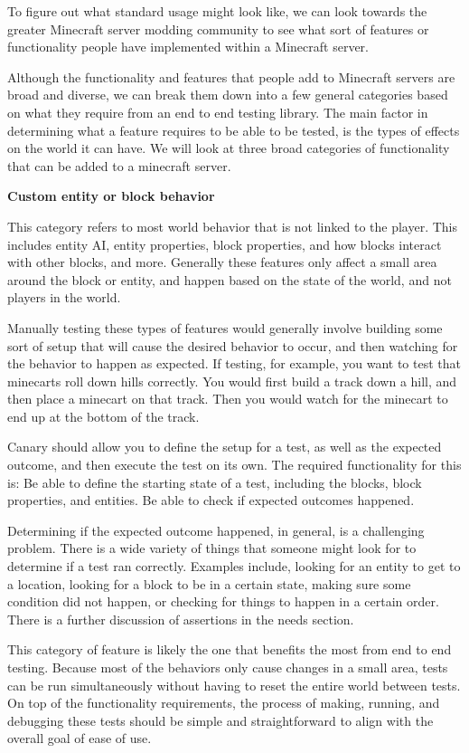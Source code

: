 \documentclass{article}
\begin{document}
\begin{doublespacing}
To figure out what standard usage might look like, we can look towards the greater Minecraft server modding community to see what sort of features or functionality people have implemented within a Minecraft server.

Although the functionality and features that people add to Minecraft servers are broad and diverse, we can break them down into a few general categories based on what they require from an end to end testing library. The main factor in determining what a feature requires to be able to be tested, is the types of effects on the world it can have. We will look at three broad categories of functionality that can be added to a minecraft server.


\noindent \textbf{Custom entity or block behavior}

This category refers to most world behavior that is not linked to the player. This includes entity AI, entity properties, block properties, and how blocks interact with other blocks, and more. Generally these features only affect a small area around the block or entity, and happen based on the state of the world, and not players in the world. 

Manually testing these types of features would generally involve building some sort of setup that will cause the desired behavior to occur, and then watching for the behavior to happen as expected. If testing, for example, you want to test that minecarts roll down hills correctly. You would first build a track down a hill, and then place a minecart on that track. Then you would watch for the minecart to end up at the bottom of the track. 

Canary should allow you to define the setup for a test, as well as the expected outcome, and then execute the test on its own.  The required functionality for this is:
Be able to define the starting state of a test, including the blocks, block properties, and entities.
Be able to check if expected outcomes happened. 

Determining if the expected outcome happened, in general, is a challenging problem. There is a wide variety of things that someone might look for to determine if a test ran correctly. Examples include, looking for an entity to get to a location, looking for a block to be in a certain state, making sure some condition did not happen, or checking for things to happen in a certain order. There is a further discussion of  assertions in the needs section.

This category of feature is likely the one that benefits the most from end to end testing. Because most of the behaviors only cause changes in a small area, tests can be run simultaneously without having to reset the entire world between tests. On top of the functionality requirements, the process of making, running, and debugging these tests should be simple and straightforward to align with the overall goal of ease of use.


\end{doublespacing}
\end{document}
